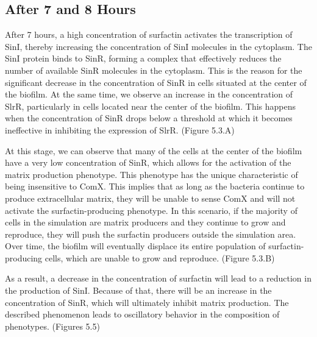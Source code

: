 \subsection{After 7 and 8 Hours}\label{sec:contrib3:theme1}

After 7 hours, a high concentration of surfactin activates the transcription of SinI, thereby increasing the concentration of SinI molecules in the cytoplasm. The SinI protein binds to SinR, forming a complex that effectively reduces the number of available SinR molecules in the cytoplasm. This is the reason for the significant decrease in the concentration of SinR in cells situated at the center of the biofilm. At the same time, we observe an increase in the concentration of SlrR, particularly in cells located near the center of the biofilm. This happens when the concentration of SinR drops below a threshold at which it becomes ineffective in inhibiting the expression of SlrR. (Figure 5.3.A)

At this stage, we can observe that many of the cells at the center of the biofilm have a very low concentration of SinR, which allows for the activation of the matrix production phenotype. This phenotype has the unique characteristic of being insensitive to ComX. This implies that as long as the bacteria continue to produce extracellular matrix, they will be unable to sense ComX and will not activate the surfactin-producing phenotype. In this scenario, if the majority of cells in the simulation are matrix producers and they continue to grow and reproduce, they will push the surfactin producers outside the simulation area. Over time, the biofilm will eventually displace its entire population of surfactin-producing cells, which are unable to grow and reproduce. (Figure 5.3.B)

As a result, a decrease in the concentration of surfactin will lead to a reduction in the production of SinI. Because of that, there will be an increase in the concentration of SinR, which will ultimately inhibit matrix production. The described phenomenon leads to oscillatory behavior in the composition of phenotypes. (Figures 5.5)

